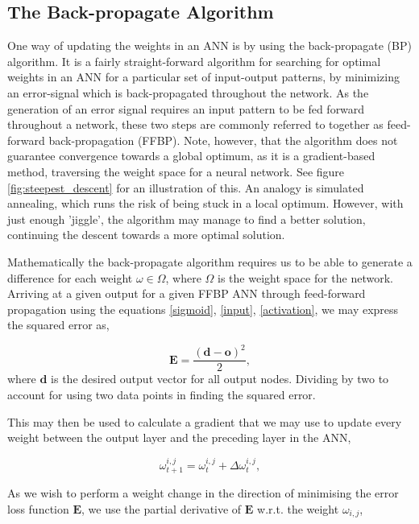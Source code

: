 \subsection{The Back-propagate Algorithm}\label{BP}

One way of updating the weights in an ANN is by using the back-propagate (BP) algorithm. It is a fairly straight-forward algorithm for searching for optimal weights in an ANN for a particular set of input-output patterns, by minimizing an error-signal which is back-propagated throughout the network. As the generation of an error signal requires an input pattern to be fed forward throughout a network, these two steps are commonly referred to together as feed-forward back-propagation (FFBP). Note, however, that the algorithm does not guarantee convergence towards a global optimum, as it is a gradient-based method, traversing the weight space for a neural network. See figure \ref{fig:steepest_descent} for an illustration of this. An analogy is simulated annealing, which runs the risk of being stuck in a local optimum. However, with just enough 'jiggle', the algorithm may manage to find a better solution, continuing the descent towards a more optimal solution.

Mathematically the back-propagate algorithm requires us to be able to generate a difference for each weight $\omega \in \Omega$, where $\Omega$ is the weight space for the network. Arriving at a given output for a given FFBP ANN through feed-forward propagation using the equations \eqref{sigmoid}, \eqref{input}, \eqref{activation}, we may express the squared error as,

\begin{equation}
    \textbf{E} = \frac{(\textbf{d} - \textbf{o})^2}{2},
\end{equation}
where $\textbf{d}$ is the desired output vector for all output nodes. Dividing by two to account for using two data points in finding the squared error.

This may then be used to calculate a gradient that we may use to update every weight between the output layer and the preceding layer in the ANN,

\begin{equation}\label{weight_update}
    \omega_{t+1}^{i,j} = \omega_{t}^{i,j} + \Delta \omega_{t}^{i,j},
\end{equation}

As we wish to perform a weight change in the direction of minimising the error loss function $\textbf{E}$, we use the partial derivative of $\textbf{E}$ w.r.t. the weight $\omega_{i,j}$,

